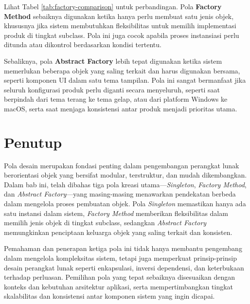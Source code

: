 Lihat Tabel \ref{tab:factory-comparison} untuk perbandingan. Pola \textbf{Factory Method} sebaiknya digunakan ketika hanya perlu membuat satu jenis objek, khususnya jika sistem membutuhkan fleksibilitas untuk memilih implementasi produk di tingkat subclass. Pola ini juga cocok apabila proses instansiasi perlu ditunda atau dikontrol berdasarkan kondisi tertentu.

Sebaliknya, pola \textbf{Abstract Factory} lebih tepat digunakan ketika sistem memerlukan beberapa objek yang saling terkait dan harus digunakan bersama, seperti komponen UI dalam satu tema tampilan. Pola ini sangat bermanfaat jika seluruh konfigurasi produk perlu diganti secara menyeluruh, seperti saat berpindah dari tema terang ke tema gelap, atau dari platform Windows ke macOS, serta saat menjaga konsistensi antar produk menjadi prioritas utama. 


\section{Penutup}

Pola desain merupakan fondasi penting dalam pengembangan perangkat lunak berorientasi objek yang bersifat modular, terstruktur, dan mudah dikembangkan. Dalam bab ini, telah dibahas tiga pola kreasi utama—\textit{Singleton}, \textit{Factory Method}, dan \textit{Abstract Factory}—yang masing-masing menawarkan pendekatan berbeda dalam mengelola proses pembuatan objek. Pola \textit{Singleton} memastikan hanya ada satu instansi dalam sistem, \textit{Factory Method} memberikan fleksibilitas dalam memilih jenis objek di tingkat subclass, sedangkan \textit{Abstract Factory} memungkinkan penciptaan keluarga objek yang saling terkait dan konsisten.

Pemahaman dan penerapan ketiga pola ini tidak hanya membantu pengembang dalam mengelola kompleksitas sistem, tetapi juga memperkuat prinsip-prinsip desain perangkat lunak seperti enkapsulasi, inversi dependensi, dan keterbukaan terhadap perluasan. Pemilihan pola yang tepat sebaiknya disesuaikan dengan konteks dan kebutuhan arsitektur aplikasi, serta mempertimbangkan tingkat skalabilitas dan konsistensi antar komponen sistem yang ingin dicapai.
